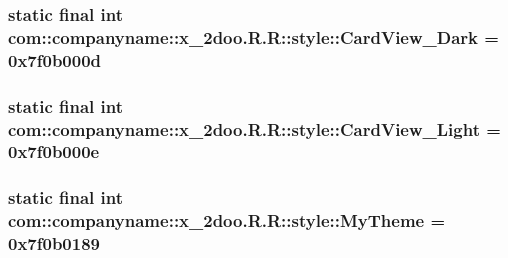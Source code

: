 \hypertarget{classcom_1_1companyname_1_1x__2doo_1_1_r_1_1style_722249f868dad0e5e503e48b222b5616}{
\subsubsection[{CardView\_\-Dark}]{\setlength{\rightskip}{0pt plus 5cm}static final int com::companyname::x\_\-2doo.R.R::style::CardView\_\-Dark = 0x7f0b000d}}
\label{classcom_1_1companyname_1_1x__2doo_1_1_r_1_1style_722249f868dad0e5e503e48b222b5616}


\hypertarget{classcom_1_1companyname_1_1x__2doo_1_1_r_1_1style_604d4d9492da33808fd84e58ef4d3703}{
\subsubsection[{CardView\_\-Light}]{\setlength{\rightskip}{0pt plus 5cm}static final int com::companyname::x\_\-2doo.R.R::style::CardView\_\-Light = 0x7f0b000e}}
\label{classcom_1_1companyname_1_1x__2doo_1_1_r_1_1style_604d4d9492da33808fd84e58ef4d3703}


\hypertarget{classcom_1_1companyname_1_1x__2doo_1_1_r_1_1style_268dc2ee0bea8792b98292cb255047b5}{
\subsubsection[{MyTheme}]{\setlength{\rightskip}{0pt plus 5cm}static final int com::companyname::x\_\-2doo.R.R::style::MyTheme = 0x7f0b0189}}
\label{classcom_1_1companyname_1_1x__2doo_1_1_r_1_1style_268dc2ee0bea8792b98292cb255047b5}


